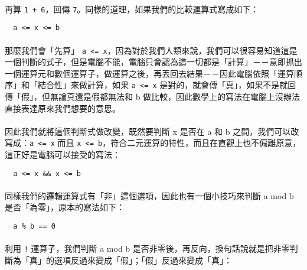 \documentclass[12pt,a4paper,oneside]{report}
\begin{document}
\begin{CJK}{UTF8}{bkai}
\paragraph{}再算 \lstinline{1 + 6}，回傳 \lstinline{7}。同樣的道理，如果我們的比較運算式寫成如下：
\begin{lstlisting}
  a <= x <= b
\end{lstlisting}
\paragraph{}那麼我們會「先算」 \lstinline{a <= x}，因為對於我們人類來說，我們可以很容易知道這是一個判斷的式子，但是電腦不能，電腦只會認為這一切都是「計算」－－意即抓出一個運算元和數個運算子，做運算之後，再丟回去結果－－因此電腦依照「運算順序」和「結合性」來做計算，如果 \lstinline{a <= x} 是對的，就會傳「真」，如果不是就回傳「假」，但無論真還是假都無法和 b 做比較，因此數學上的寫法在電腦上沒辦法直接表達原來我們想要的意思。
\paragraph{}因此我們就將這個判斷式做改變，既然要判斷 x 是否在 a 和 b 之間，我們可以改寫成：\lstinline{a <= x} 而且 \lstinline{x <= b}，符合二元運算的特性，而且在直觀上也不偏離原意，這正好是電腦可以接受的寫法：
\begin{lstlisting}
  a <= x && x <= b
\end{lstlisting}
\paragraph{}同樣我們的邏輯運算式有「非」這個選項，因此也有一個小技巧來判斷 a mod b 是否「為零」，原本的寫法如下：
\begin{lstlisting}
  a % b == 0
\end{lstlisting}
\paragraph{}利用 \lstinline{!} 運算子，我們判斷 a mod b 是否非零後，再反向，換句話說就是把非零判斷為「真」的選項反過來變成「假」；「假」反過來變成「真」：


\ifx \allfiles \undefined
\printindex[noun]

\clearpage
\end{CJK}
\end{document}
